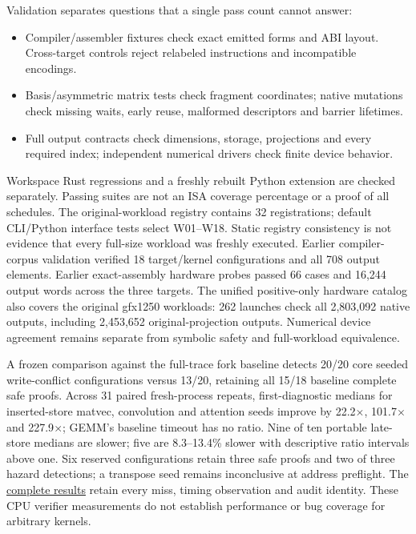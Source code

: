 \documentclass[10pt,letterpaper]{article}
\newcommand{\code}[1]{\texttt{\detokenize{#1}}}
\begin{document}
Validation separates questions that a single pass count cannot answer:
\begin{itemize}
\item Compiler/assembler fixtures check exact emitted forms and ABI layout.
Cross-target controls reject relabeled instructions and incompatible encodings.
\item Basis/asymmetric matrix tests check fragment coordinates; native mutations
check missing waits, early reuse, malformed descriptors and barrier lifetimes.
\item Full output contracts check dimensions, storage, projections and every
required index; independent numerical drivers check finite device behavior.
\end{itemize}
Workspace Rust regressions and a freshly rebuilt Python extension are checked
separately. Passing suites are not an ISA coverage percentage or a proof of all
schedules. The original-workload
registry contains 32 registrations; default CLI/Python interface tests select
W01--W18. Static registry consistency is not evidence that every full-size
workload was freshly executed. Earlier compiler-corpus validation verified
18 target/kernel configurations and all 708 output elements. Earlier exact-assembly
hardware probes passed 66 cases and 16,244 output words across the
three targets. The unified positive-only hardware catalog also covers the
original gfx1250 workloads: 262 launches check all 2,803,092 native outputs,
including 2,453,652 original-projection outputs. Numerical device agreement
remains separate from symbolic safety and full-workload equivalence.

A frozen comparison against the full-trace fork baseline \code{0e634bc} detects
20/20 core seeded write-conflict configurations versus 13/20, retaining all
15/18 baseline complete safe proofs. Across 31 paired fresh-process repeats,
first-diagnostic medians for inserted-store matvec, convolution and attention
seeds improve by 22.2$\times$, 101.7$\times$ and 227.9$\times$; GEMM's baseline
timeout has no ratio. Nine of ten portable late-store medians are slower;
five are 8.3--13.4\% slower with descriptive ratio intervals above one.
Six reserved configurations retain three safe proofs and two of three hazard
detections; a transpose seed remains inconclusive at address preflight.
The \href{https://github.com/harsh-nod/ptx_verifier/blob/44dcc61a12986ae51f8cb09486d34022fdec9fa8/tests/amdgpu/memory-conflicts-study/results/README.md}{complete results}
retain every miss, timing observation and audit identity. These CPU verifier
measurements do not establish performance or bug coverage for arbitrary kernels.
\end{document}
